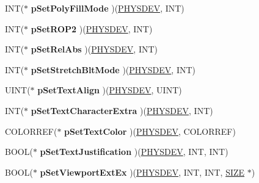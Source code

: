 \begin{DoxyCompactItemize}
I\+NT($\ast$ {\bfseries p\+Set\+Poly\+Fill\+Mode} )(\hyperlink{structgdi__physdev}{P\+H\+Y\+S\+D\+EV}, I\+NT)
\item 
\mbox{\label{structgdi__dc__funcs_a99d38b9c91bb9a56680545cc95bfdaa0}} 
I\+NT($\ast$ {\bfseries p\+Set\+R\+O\+P2} )(\hyperlink{structgdi__physdev}{P\+H\+Y\+S\+D\+EV}, I\+NT)
\item 
\mbox{\label{structgdi__dc__funcs_aaf3d84f7f848867533613515d9b0a889}} 
I\+NT($\ast$ {\bfseries p\+Set\+Rel\+Abs} )(\hyperlink{structgdi__physdev}{P\+H\+Y\+S\+D\+EV}, I\+NT)
\item 
\mbox{\label{structgdi__dc__funcs_ad859831959caeb1351dcfc985485ae0c}} 
I\+NT($\ast$ {\bfseries p\+Set\+Stretch\+Blt\+Mode} )(\hyperlink{structgdi__physdev}{P\+H\+Y\+S\+D\+EV}, I\+NT)
\item 
\mbox{\label{structgdi__dc__funcs_a0a877c72897cac472acc78d5fdafb25b}} 
U\+I\+NT($\ast$ {\bfseries p\+Set\+Text\+Align} )(\hyperlink{structgdi__physdev}{P\+H\+Y\+S\+D\+EV}, U\+I\+NT)
\item 
\mbox{\label{structgdi__dc__funcs_aa51c1d2cfae038d1d55c2c64cbd67127}} 
I\+NT($\ast$ {\bfseries p\+Set\+Text\+Character\+Extra} )(\hyperlink{structgdi__physdev}{P\+H\+Y\+S\+D\+EV}, I\+NT)
\item 
\mbox{\label{structgdi__dc__funcs_aa5008a3b10067df7bd23325cb4e1a2b5}} 
C\+O\+L\+O\+R\+R\+EF($\ast$ {\bfseries p\+Set\+Text\+Color} )(\hyperlink{structgdi__physdev}{P\+H\+Y\+S\+D\+EV}, C\+O\+L\+O\+R\+R\+EF)
\item 
\mbox{\label{structgdi__dc__funcs_a6a03121e4cfcd0e6858f1f1836bb5ff1}} 
B\+O\+OL($\ast$ {\bfseries p\+Set\+Text\+Justification} )(\hyperlink{structgdi__physdev}{P\+H\+Y\+S\+D\+EV}, I\+NT, I\+NT)
\item 
\mbox{\label{structgdi__dc__funcs_afb5599d24737e565ce69f249e38eb863}} 
B\+O\+OL($\ast$ {\bfseries p\+Set\+Viewport\+Ext\+Ex} )(\hyperlink{structgdi__physdev}{P\+H\+Y\+S\+D\+EV}, I\+NT, I\+NT, \hyperlink{structtag_s_i_z_e}{S\+I\+ZE} $\ast$)
\item 

\end{DoxyCompactItemize}
